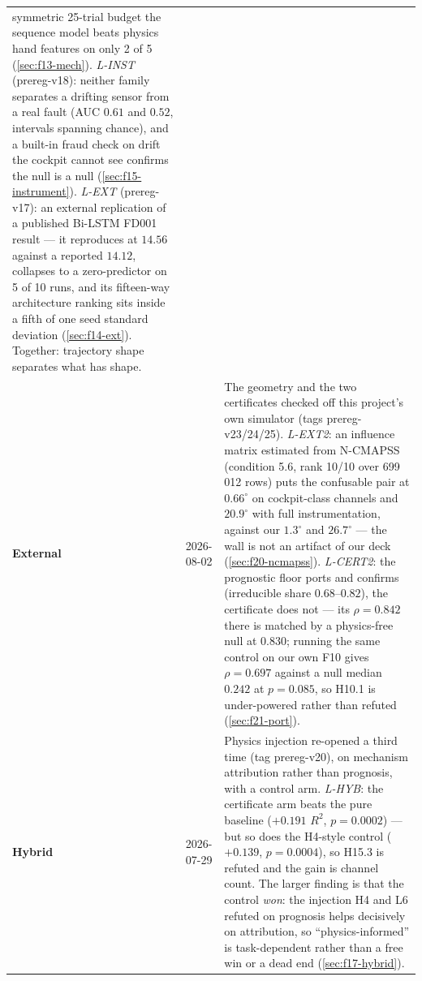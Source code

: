 \begin{table}[htbp]
\begin{tabular}{lp{}p{}}
      symmetric 25-trial budget the sequence model beats physics hand features on only 2 of 5
      (\cref{sec:f13-mech}). \emph{L-INST} (prereg-v18): neither family separates a drifting
      sensor from a real fault (AUC $0.61$ and $0.52$, intervals spanning chance), and a
      built-in fraud check on drift the cockpit cannot see confirms the null is a null
      (\cref{sec:f15-instrument}). \emph{L-EXT} (prereg-v17): an external replication of a
      published Bi-LSTM FD001 result --- it reproduces at $14.56$ against a reported $14.12$,
      collapses to a zero-predictor on 5 of 10 runs, and its fifteen-way architecture ranking
      sits inside a fifth of one seed standard deviation (\cref{sec:f14-ext}). Together:
      trajectory shape separates what has shape. \\
    \textbf{External} & 2026-08-02 & The geometry and the two certificates checked off this
      project's own simulator (tags prereg-v23/24/25). \emph{L-EXT2}: an influence matrix
      estimated from N-CMAPSS (condition 5.6, rank 10/10 over 699\,012 rows) puts the
      confusable pair at $0.66^{\circ}$ on cockpit-class channels and $20.9^{\circ}$ with full
      instrumentation, against our $1.3^{\circ}$ and $26.7^{\circ}$ --- the wall is not an
      artifact of our deck (\cref{sec:f20-ncmapss}). \emph{L-CERT2}: the prognostic floor ports
      and confirms (irreducible share $0.68$--$0.82$), the certificate does not --- its
      $\rho=0.842$ there is matched by a physics-free null at $0.830$; running the same control
      on our own F10 gives $\rho=0.697$ against a null median $0.242$ at $p=0.085$, so H10.1 is
      under-powered rather than refuted (\cref{sec:f21-port}). \\
    \textbf{Hybrid} & 2026-07-29 & Physics injection re-opened a third time (tag
      prereg-v20), on mechanism attribution rather than prognosis, with a control arm.
      \emph{L-HYB}: the certificate arm beats the pure baseline ($+0.191$ $R^2$,
      $p=0.0002$) --- but so does the H4-style control ($+0.139$, $p=0.0004$), so H15.3 is
      refuted and the gain is channel count. The larger finding is that the control
      \emph{won}: the injection H4 and L6 refuted on prognosis helps decisively on
      attribution, so ``physics-informed'' is task-dependent rather than a free win or a
      dead end (\cref{sec:f17-hybrid}). \\
    \bottomrule
  \end{tabular}
\end{table}
